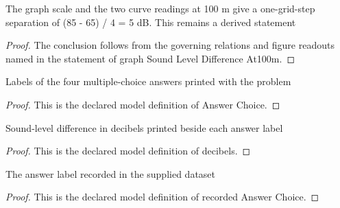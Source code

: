 \begin{lemma}
  \label{lem:physics:phyx-mini-0317:phyxminiproblems-problemphyxmini0317-graphsoundleveldifferenceat100m}
  The graph scale and the two curve readings at 100 m give a one-grid-step separation of (85 - 65) / 4 = 5 dB. This remains a derived statement
\end{lemma}
\begin{proof}
  The conclusion follows from the governing relations and figure readouts named in the statement of graph Sound Level Difference At100m.
\end{proof}
\begin{definition}
  \label{def:physics:phyx-mini-0317:phyxminiproblems-problemphyxmini0317-answerchoice}
  Labels of the four multiple-choice answers printed with the problem
\end{definition}
\begin{proof}
  This is the declared model definition of Answer Choice.
\end{proof}
\begin{definition}[decibels]
  \label{def:physics:phyx-mini-0317:phyxminiproblems-problemphyxmini0317-answerchoice-decibels}
  Sound-level difference in decibels printed beside each answer label
\end{definition}
\begin{proof}
  This is the declared model definition of decibels.
\end{proof}
\begin{definition}
  \label{def:physics:phyx-mini-0317:phyxminiproblems-problemphyxmini0317-recordedanswerchoice}
  The answer label recorded in the supplied dataset
\end{definition}
\begin{proof}
  This is the declared model definition of recorded Answer Choice.
\end{proof}
